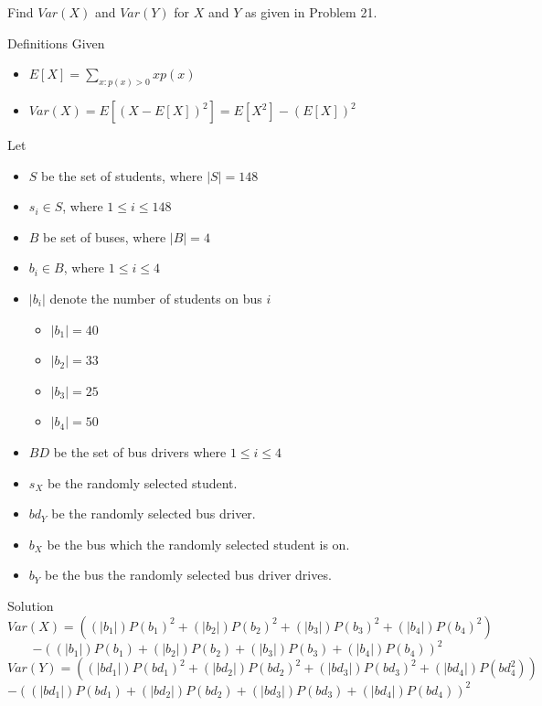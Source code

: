 \documentclass{article}
\begin{document}
\begin{spacing}{1.1}
\newpage
\begin{homeworkProblem}
  Find $Var( X)$ and $Var( Y)$ for $X$ and $Y$ as given in Problem 21.
  \begin{homeworkSection}{Definitions}
    Given
      \begin{itemize}
        \item $E[ X] = \sum\limits_{x:p( x) > 0}{ x p( x)}$
        \item $Var( X) = E[ (X - E[ X])^2] = E[ X^2] - (E[ X])^2$
      \end{itemize}
    Let
      \begin{itemize}
        \item $S$ be the set of students, where $|S| = 148$
        \item $s_i \in S$, where $1 \le i \le 148$
        \item $B$ be set of buses, where $|B| = 4$
        \item $b_i \in B$, where $1 \le i \le 4$
        \item $|b_i|$ denote the number of students on bus $i$
          \begin{itemize}
            \item $|b_1| = 40$
            \item $|b_2| = 33$
            \item $|b_3| = 25$
            \item $|b_4| = 50$
          \end{itemize}
        \item $BD$ be the set of bus drivers where $1 \le i \le 4$
        \item $s_X$ be the randomly selected student.
        \item $bd_Y$ be the randomly selected bus driver.
        \item $b_X$ be the bus which the randomly selected student is on.
        \item $b_Y$ be the bus the randomly selected bus driver drives.
      \end{itemize}
  \end{homeworkSection}
  \begin{homeworkSection}{Solution}
    \[Var( X) =  \left((|b_1|) P( b_1)^2 + (|b_2|) P( b_2)^2 + (|b_3|) P( b_3)^2 + (|b_4|) P( b_4)^2\right)\]
        \[- \left((|b_1|) P( b_1) + (|b_2|) P( b_2) + (|b_3|) P( b_3) + (|b_4|) P( b_4)\right)^2\]
    \[Var( Y) = \left((|bd_1|) P( bd_1)^2 + (|bd_2|) P( bd_2)^2 + (|bd_3|) P( bd_3)^2 + (|bd_4|) P( bd_4^2)\right)\]
       \[- \left((|bd_1|) P( bd_1) + (|bd_2|) P( bd_2) + (|bd_3|) P( bd_3) + (|bd_4|) P( bd_4)\right)^2\]
  \end{homeworkSection}
\end{homeworkProblem}
\end{spacing}
\end{document}
